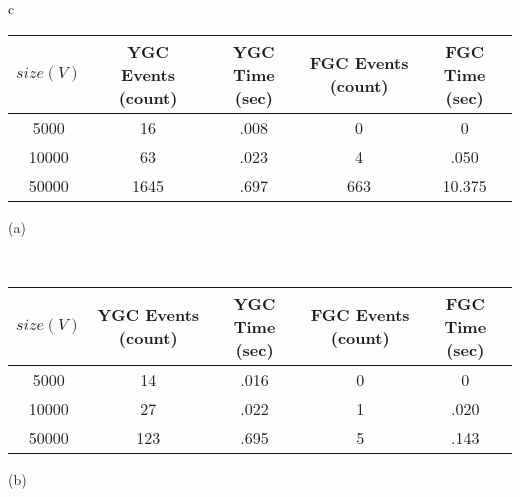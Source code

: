 \documentclass{sig-alternate}
\begin{document}
\begin{table*}[t]
  

  \begin{tabular}{c}

    \hspace*{.75in}
    \begin{minipage}{3in}
  
  {\normalsize
  
  \begin{center}
  \begin{tabular}{| c | c | c | c | c |}
  \hline
  $size(V)$ & YGC Events (count) & YGC Time (sec) &  
  FGC Events (count) & FGC Time (sec) \\  \hline
  5000  & 16 & .008 & 0 & 0 \\
  10000 & 63  & .023 & 4 & .050 \\
  50000 & 1645  & .697 & 663 & 10.375 \\
  \hline 
  \end{tabular} \newline 
   \end{center} }
  \vspace{-.21in} 
  \begin{center} \mbox{} \hspace*{2.2in} (a) \end{center}

  \end{minipage} \\

    \hspace*{.75in}
    
    \begin{minipage}{3in}

      \vspace*{.1in}

	      {\normalsize
  
  \begin{center}
  \begin{tabular}{| c | c | c | c | c |}
  \hline
  $size(V)$ & YGC Events (count) & YGC Time (sec) &  
  FGC Events (count) & FGC Time (sec) \\  \hline
  5000  & 14 & .016 & 0 & 0 \\
  10000 & 27 & .022 & 1 & .020 \\
  50000 & 123 & .695 & 5 & .143 \\
  \hline 
  \end{tabular} \newline
  \end{center} }
  \vspace*{-.2in} 
  \begin{center}\mbox{} \hspace*{2.2in} (b) \end{center}


\end{minipage}
\end{tabular}
\end{table*}
\end{document}
